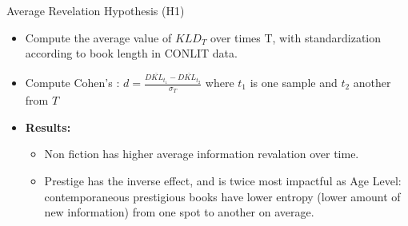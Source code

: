 \documentclass[aspectratio=169]{beamer}
\begin{document}
\begin{frame}{Average Revelation Hypothesis (H1)}
    \begin{itemize}
        \item Compute the average value of $KLD_{T}$ over times T, with standardization according to book length in CONLIT data.
        \item Compute Cohen's : $d = \frac{\overline{DKL_{t_{1}}} - \overline{DKL_{t_{2}}}}{\sigma_{T}}$ where $t_{1}$ is one sample and $t_{2}$ another from $T$
        \item \textbf{Results:}
        \begin{itemize}
            \item Non fiction has higher average information revalation over time.
            \item Prestige has the inverse effect, and is twice most impactful as Age Level: contemporaneous prestigious books have lower entropy (lower amount of new information) from one spot to another on average.
        \end{itemize}
    \end{itemize}
\end{frame}
\end{document}
